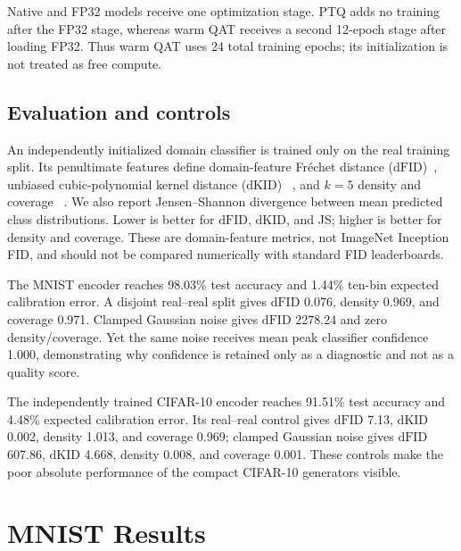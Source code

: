 \documentclass[conference]{IEEEtran}
\newcommand{\dfid}{\ensuremath{\mathrm{dFID}}}
\newcommand{\dkid}{\ensuremath{\mathrm{dKID}}}
\begin{document}
Native and FP32 models receive one optimization stage. PTQ adds no training after
the FP32 stage, whereas warm QAT receives a second 12-epoch stage after loading
FP32. Thus warm QAT uses 24 total training epochs; its initialization is not
treated as free compute.

\subsection{Evaluation and controls}

An independently initialized domain classifier is trained only on the real
training split. Its penultimate features define domain-feature Fr\'echet distance
(\dfid)~\cite{heusel2017fid}, unbiased cubic-polynomial kernel distance (\dkid)
~\cite{binkowski2018kid}, and $k=5$ density and coverage
~\cite{naeem2020density}. We also report Jensen--Shannon divergence between mean
predicted class distributions. Lower is better for \dfid, \dkid, and JS; higher
is better for density and coverage. These are domain-feature metrics, not
ImageNet Inception FID, and should not be compared numerically with standard FID
leaderboards.

The MNIST encoder reaches 98.03\% test accuracy and 1.44\% ten-bin expected
calibration error. A disjoint real--real split gives \dfid{} 0.076, density
0.969, and coverage 0.971. Clamped Gaussian noise gives \dfid{} 2278.24 and zero
density/coverage. Yet the same noise receives mean peak classifier confidence
1.000, demonstrating why confidence is retained only as a diagnostic and not as a
quality score.

The independently trained CIFAR-10 encoder reaches 91.51\% test accuracy and
4.48\% expected calibration error. Its real--real control gives \dfid{} 7.13,
\dkid{} 0.002, density 1.013, and coverage 0.969; clamped Gaussian noise gives
\dfid{} 607.86, \dkid{} 4.668, density 0.008, and coverage 0.001. These controls
make the poor absolute performance of the compact CIFAR-10 generators visible.

\section{MNIST Results}
\end{document}
